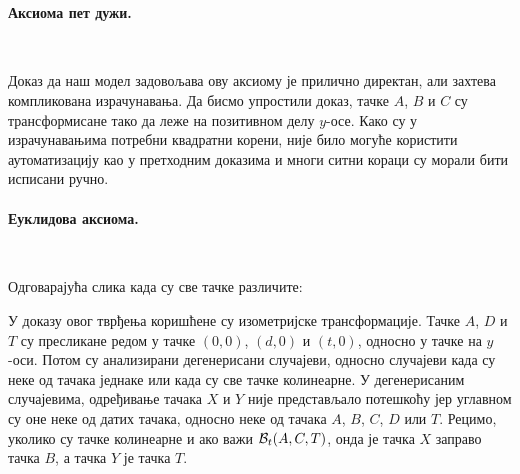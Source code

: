 \paragraph{Аксиома пет дужи.}
{\tt
\begin{tabbing}
\hspace{5mm}\=assumes\ \=\kill
\textbf{lemma} "$\congrt{A}{B}{A'}{B'} \,\wedge\, \congrt{B}{C}{B'}{C'}  \,\wedge\,  \congrt{A}{D}{A'}{D'}  \,\wedge\,  \congrt{B}{D}{B'}{D'} \,\wedge\,$}\\
\>$\bett{A}{B}{C} \,\wedge\, \bett{A'}{B'}{C'} \,\wedge\, A \neq B \longrightarrow  \congrt{C}{D}{C'}{D'}$"}
\end{tabbing}
}
Доказ да наш модел задовољава ову аксиому је прилично директан, али
захтева компликована израчунавања. Да бисмо упростили доказ, тачке $A$,
$B$ и $C$ су трансформисане тако да леже на позитивном делу
$y$-осе. Како су у израчунавањима потребни квадратни корени, није било
могуће користити аутоматизацију као у претходним доказима и многи
ситни кораци су морали бити исписани ручно.

\paragraph{Еуклидова аксиома.}
{\tt
\begin{tabbing}
\hspace{10mm}\=assumes\ \=\kill
\textbf{lemma} "$\bett{A}{D}{T} \,\wedge\, \bett{B}{D}{C} \,\wedge\, A \neq D \ \longrightarrow\ $}\\
\>$(\exists X Y.\ (\bett{A}{B}{X}\ \wedge\ \bett{A}{C}{Y}\ \wedge\ \bett{X}{T}{Y}))$"}
\end{tabbing}
}
Одговарајућа слика када су све тачке различите:

\begin{center}

\end{center}

У доказу овог тврђења коришћене су изометријске трансформације. Тачке
$A$, $D$ и $T$ су пресликане редом у тачке $(0, 0)$, $(d, 0)$ и $(t,
0)$, односно у тачке на $y$-оси. Потом су анализирани дегенерисани
случајеви, односно случајеви када су неке од тачака једнаке или када
су све тачке колинеарне. У дегенерисаним случајевима, одређивање тачака
$X$ и $Y$ није представљало потешкоћу јер углавном су оне неке од
датих тачака, односно неке од тачака $A$, $B$, $C$, $D$ или
$T$. Рецимо, уколико су тачке колинеарне и ако важи $\mathcal{B}_t(A, C, T)$,
онда је тачка $X$ заправо тачка $B$, а тачка $Y$ је тачка $T$.

